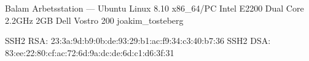 \documentclass[a5paper]{article}
\begin{document}
   \computerdescription
       {Balam}
       {Arbetsstation}
       {---}
       {Ubuntu Linux 8.10}
       {x86\_64/PC}
       {Intel E2200 Dual Core 2.2GHz}
       {2GB}
       {Dell Vostro 200}
       {joakim\_tosteberg}


   \sshfingerprintheading
   \begin{sshfingerprint}
SSH2 RSA: 23:3a:9d:b9:0b:de:93:29:b1:ac:f9:34:c3:40:b7:36
SSH2 DSA: 83:ee:22:80:cf:ac:72:6d:9a:dc:de:6d:c1:d6:3f:31
   \end{sshfingerprint}
\end{document}
